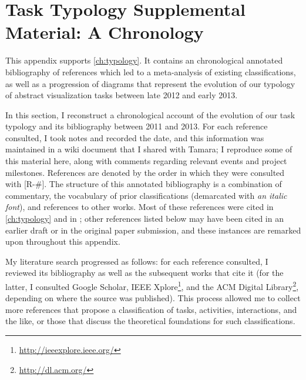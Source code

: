 
\chapter[Appendix: Task Typology (A Chronology)]{Task Typology Supplemental Material: A Chronology}
\label{app:typology}


This appendix supports \autoref{ch:typology}.
It contains an chronological annotated bibliography of references which led to a meta-analysis of existing classifications, as well as a progression of diagrams that represent the evolution of our typology of abstract visualization tasks between late 2012 and early 2013.

In this section, I reconstruct a chronological account of the evolution of our task typology and its bibliography between 2011 and 2013.
For each reference consulted, I took notes and recorded the date, and this information was maintained in a wiki document that I shared with Tamara; I reproduce some of this material here, along with comments regarding relevant events and project milestones.
References are denoted by the order in which they were consulted with [R-\#].
The structure of this annotated bibliography is a combination of commentary, the vocabulary of prior classifications (demarcated with {\it an italic font}), and references to other works.
Most of these references were cited in \autoref{ch:typology} and in \citet{Brehmer2013}; other references listed below may have been cited in an earlier draft or in the original paper submission, and these instances are remarked upon throughout this appendix.

My literature search progressed as follows: for each reference consulted, I reviewed its bibliography as well as the subsequent works that cite it (for the latter, I consulted Google Scholar, IEEE Xplore\footnote{\url{http://ieeexplore.ieee.org/}}, and the ACM Digital Library\footnote{\url{http://dl.acm.org/}}, depending on where the source was published).
This process allowed me to collect more references that propose a classification of tasks, activities, interactions, and the like, or those that discuss the theoretical foundations for such classifications.

